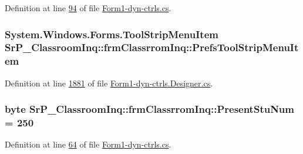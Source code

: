 \-Definition at line \hyperlink{_form1-dyn-ctrls_8cs_source_l00094}{94} of file \hyperlink{_form1-dyn-ctrls_8cs_source}{\-Form1-\/dyn-\/ctrls.\-cs}.

\hypertarget{class_sr_p___classroom_inq_1_1frm_classrrom_inq_ab36e4efbf8b003fc5007cc6522901c21}{
\subsubsection[{\-Prefs\-Tool\-Strip\-Menu\-Item}]{\setlength{\rightskip}{0pt plus 5cm}\-System.\-Windows.\-Forms.\-Tool\-Strip\-Menu\-Item {\bf \-Sr\-P\-\_\-\-Classroom\-Inq\-::frm\-Classrrom\-Inq\-::\-Prefs\-Tool\-Strip\-Menu\-Item}}}
\label{class_sr_p___classroom_inq_1_1frm_classrrom_inq_ab36e4efbf8b003fc5007cc6522901c21}


\-Definition at line \hyperlink{_form1-dyn-ctrls_8_designer_8cs_source_l01881}{1881} of file \hyperlink{_form1-dyn-ctrls_8_designer_8cs_source}{\-Form1-\/dyn-\/ctrls.\-Designer.\-cs}.

\hypertarget{class_sr_p___classroom_inq_1_1frm_classrrom_inq_ad5da56ffdb5d79486d9cf4eb7c3f44d4}{
\subsubsection[{\-Present\-Stu\-Num}]{\setlength{\rightskip}{0pt plus 5cm}byte {\bf \-Sr\-P\-\_\-\-Classroom\-Inq\-::frm\-Classrrom\-Inq\-::\-Present\-Stu\-Num} = 250}}
\label{class_sr_p___classroom_inq_1_1frm_classrrom_inq_ad5da56ffdb5d79486d9cf4eb7c3f44d4}


\-Definition at line \hyperlink{_form1-dyn-ctrls_8cs_source_l00064}{64} of file \hyperlink{_form1-dyn-ctrls_8cs_source}{\-Form1-\/dyn-\/ctrls.\-cs}.

